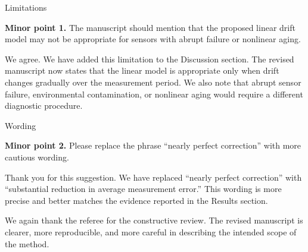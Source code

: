 \begin{replypoint}[Revised]{Limitations}
\begin{refereecomment}
\textbf{Minor point 1.} The manuscript should mention that the proposed linear drift model may not be appropriate for sensors with abrupt failure or nonlinear aging.
\end{refereecomment}

\begin{authorreply}
We agree. We have added this limitation to the Discussion section. The revised manuscript now states that the linear model is appropriate only when drift changes gradually over the measurement period. We also note that abrupt sensor failure, environmental contamination, or nonlinear aging would require a different diagnostic procedure.

\end{authorreply}
\end{replypoint}

\begin{replypoint}[Revised]{Wording}
\begin{refereecomment}
\textbf{Minor point 2.} Please replace the phrase ``nearly perfect correction'' with more cautious wording.
\end{refereecomment}

\begin{authorreply}
Thank you for this suggestion. We have replaced ``nearly perfect correction'' with ``substantial reduction in average measurement error.'' This wording is more precise and better matches the evidence reported in the Results section.

\end{authorreply}
\end{replypoint}

\vspace{1em}
We again thank the referee for the constructive review. The revised manuscript is clearer, more reproducible, and more careful in describing the intended scope of the method.
